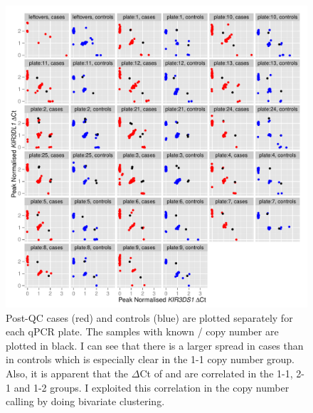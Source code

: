 \begin{figure}[h]
    \centering
        \includegraphics[scale=.9] {figures/Figure-S2.pdf}
        {Post-QC cases (red) and controls (blue) are plotted separately for each qPCR plate.}
        { The samples with known / copy number are plotted in black.
        I can see that there is a larger spread in cases than in controls which is especially clear in the 1-1 copy number group.
        Also, it is apparent that the $\Delta$Ct of  and  are correlated in the 1-1, 2-1 and 1-2 groups.
        I exploited this correlation in the copy number calling by doing bivariate clustering.  }
\end{figure}



